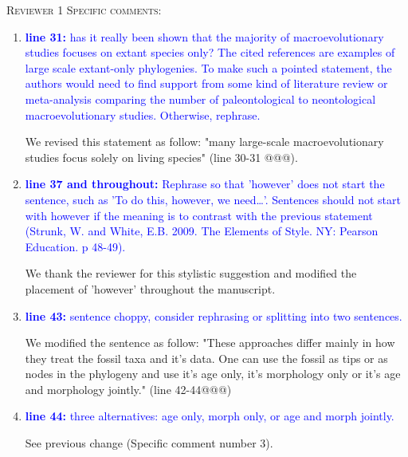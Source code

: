 \documentclass[12pt,letterpaper]{article}
\renewcommand{\section}[1]{%
\bigskip
\begin{center}
\begin{Large}
\normalfont\scshape #1
\medskip
\end{Large}
\end{center}}
\begin{document}
\section{Reviewer 1 Specific comments:}
\begin{enumerate}

\item{\textcolor{blue}{\textbf{line 31:} has it really been shown that the majority of macroevolutionary studies focuses on extant species only? The cited references are examples of large scale extant-only phylogenies. To make such a pointed statement, the authors would need to find support from some kind of literature review or meta-analysis comparing the number of paleontological to neontological macroevolutionary studies. Otherwise, rephrase. }}

We revised this statement as follow: "many large-scale macroevolutionary studies focus solely on living species" (line 30-31 @@@).

\item{\textcolor{blue}{\textbf{line 37 and throughout:} Rephrase so that 'however' does not start the sentence, such as 'To do this, however, we need…'. Sentences should not start with however if the meaning is to contrast with the previous statement (Strunk, W. and White, E.B. 2009. The Elements of Style. NY: Pearson Education. p 48-49).}}

We thank the reviewer for this stylistic suggestion and modified the placement of 'however' throughout the manuscript.

\item{\textcolor{blue}{\textbf{line 43:} sentence choppy, consider rephrasing or splitting into two sentences.}}

We modified the sentence as follow: "These approaches differ mainly in how they treat the fossil taxa and it's data. One can use the fossil as tips or as nodes in the phylogeny and use it's age only, it's morphology only or it's age and morphology jointly." (line 42-44@@@)

\item{\textcolor{blue}{\textbf{line 44:} three alternatives: age only, morph only, or age and morph jointly. }}

See previous change (Specific comment number 3).


\end{enumerate}
\end{document}
